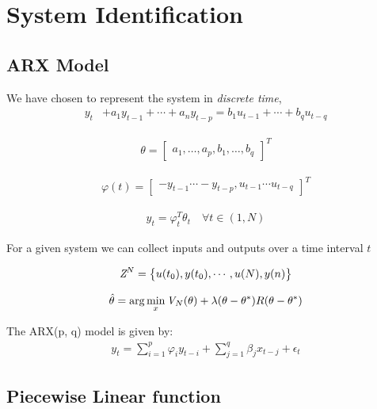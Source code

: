 \section{System Identification}
\subsection*{ARX Model}
We have chosen to represent the system in \textit{discrete time},
\begin{align}
    y_t &+ a_1 y_{t-1} + \cdots + a_n y_{t-p} = b_1 u_{t-1} + \cdots + b_q u_{t-q}
\end{align}

\begin{align}
    \theta = \begin{bmatrix}
    a_1, \ldots, a_p, b_1, \ldots, b_q
    \end{bmatrix}^T
\end{align} 

\begin{align}
    \varphi(t) = \begin{bmatrix}
    -y_{t-1} \cdots - y_{t-p}, u_{t-1} \cdots u_{t-q}
    \end{bmatrix}^T
\end{align}

\begin{align}
    y_t = \varphi^T_t \theta_t \quad  \forall t \in (1, N)
\end{align}



For a given system we can collect inputs and outputs over a time
interval $t$

\begin{align}
	\emph{Z}^N = \big \{u(t_0), y(t_0), \cdots, u(N), y(n)\big \}
\end{align}


\begin{align}
	\hat{\theta} = \arg\min_{x} \emph{V}_N(\theta) + \lambda(\theta - \theta^*)R(\theta - \theta^*)
\end{align}

The ARX(p, q) model is given by:
\begin{align}
y_t = \sum_{i=1}^p \varphi_i y_{t-i} + \sum_{j=1}^q \beta_j x_{t-j} + \epsilon_t
\end{align}


\subsection{Piecewise Linear function}

